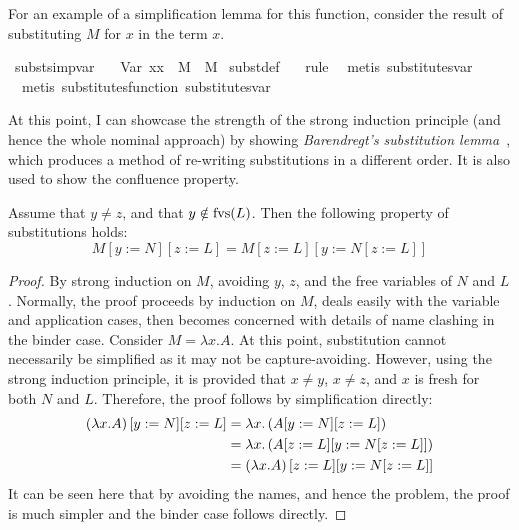 For an example of a simplification lemma for this function, consider the result of substituting \(M\) for \(x\) in the term \(x\).

\begin{implementation}
\isamarkupfalse%
\ subst{\isacharunderscore}simp{\isacharunderscore}var{}{\isacharcolon}\isanewline
\ \ \ {\isachardoublequoteopen}{\isacharparenleft}Var\ x{\isacharparenright}{\isacharbrackleft}x\ {\isacharcolon}{\isacharcolon}{\isacharequal}\ M{\isacharbrackright}\ {\isacharequal}\ M{\isachardoublequoteclose}\isanewline
\isatagproof
{}\isamarkupfalse%
\ subst{\isacharunderscore}def\ \isamarkupfalse%
{\isacharparenleft}\isanewline
\ \ rule{\isacharcomma}\isanewline
\ \ metis\ substitutes{\isachardot}var{}{\isacharcomma}\isanewline
\ \ metis\ substitutes{\isacharunderscore}function\ substitutes{\isachardot}var{}\isanewline
{\isacharparenright}%
\end{implementation}

At this point, I can showcase the strength of the strong induction principle (and hence the whole nominal approach) by showing \emph{Barendregt's substitution lemma}~\cite{lambda-overview}, which produces a method of re-writing substitutions in a different order.
It is also used to show the confluence property.

\begin{lemma}
Assume that \(y \neq z\), and that \(y \notin \mathrm{fvs}(L)\).
Then the following property of substitutions holds:
\[
M[y := N][z := L] = M[z := L][y := N[z := L]]
\]
\end{lemma}
\begin{proof}
By strong induction on \(M\), avoiding \(y\), \(z\), and the free variables of \(N\) and \(L\).
Normally, the proof proceeds by induction on \(M\), deals easily with the variable and application cases, then becomes concerned with details of name clashing in the binder case.
Consider \(M = \lambda x. A\).
At this point, substitution cannot necessarily be simplified as it may not be capture-avoiding.
However, using the strong induction principle, it is provided that \(x \neq y\), \(x \neq z\), and \(x\) is fresh for both \(N\) and \(L\).
Therefore, the proof follows by simplification directly:
\begin{align*}
\left(\lambda x. A\right)[y := N][z := L]
&= \lambda x. \left(A[y := N][z := L]\right)\\
&= \lambda x. \left(A[z := L][y := N[z := L]]\right)\\
&= \left(\lambda x. A\right)[z := L][y := N[z := L]]
\end{align*}
It can be seen here that by avoiding the names, and hence the problem, the proof is much simpler and the binder case follows directly.
\end{proof}

